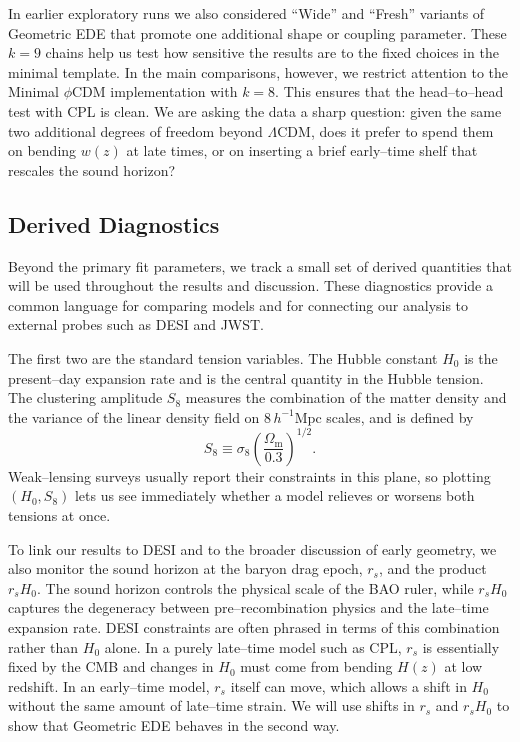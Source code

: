 \documentclass[a4paper,11pt]{article}
\begin{document}
In earlier exploratory runs we also considered ``Wide'' and ``Fresh'' variants of Geometric EDE that promote one additional shape or coupling parameter. These $k = 9$ chains help us test how sensitive the results are to the fixed choices in the minimal template. In the main comparisons, however, we restrict attention to the Minimal $\phi$CDM implementation with $k = 8$. This ensures that the head--to--head test with CPL is clean. We are asking the data a sharp question: given the same two additional degrees of freedom beyond $\Lambda$CDM, does it prefer to spend them on bending $w(z)$ at late times, or on inserting a brief early--time shelf that rescales the sound horizon?


\subsection{Derived Diagnostics}
\label{sec:diagnostics}

Beyond the primary fit parameters, we track a small set of derived quantities that will be used throughout the results and discussion. These diagnostics provide a common language for comparing models and for connecting our analysis to external probes such as DESI and JWST.

The first two are the standard tension variables. The Hubble constant $H_0$ is the present--day expansion rate and is the central quantity in the Hubble tension. The clustering amplitude $S_8$ measures the combination of the matter density and the variance of the linear density field on $8\,h^{-1}\mathrm{Mpc}$ scales, and is defined by
\begin{equation}
S_8 \equiv \sigma_8 \left(\frac{\Omega_{\mathrm{m}}}{0.3}\right)^{1/2}.
\end{equation}
Weak--lensing surveys usually report their constraints in this plane, so plotting $(H_0, S_8)$ lets us see immediately whether a model relieves or worsens both tensions at once.

To link our results to DESI and to the broader discussion of early geometry, we also monitor the sound horizon at the baryon drag epoch, $r_s$, and the product $r_s H_0$. The sound horizon controls the physical scale of the BAO ruler, while $r_s H_0$ captures the degeneracy between pre--recombination physics and the late--time expansion rate. DESI constraints are often phrased in terms of this combination rather than $H_0$ alone. In a purely late--time model such as CPL, $r_s$ is essentially fixed by the CMB and changes in $H_0$ must come from bending $H(z)$ at low redshift. In an early--time model, $r_s$ itself can move, which allows a shift in $H_0$ without the same amount of late--time strain. We will use shifts in $r_s$ and $r_s H_0$ to show that Geometric EDE behaves in the second way.
\end{document}
